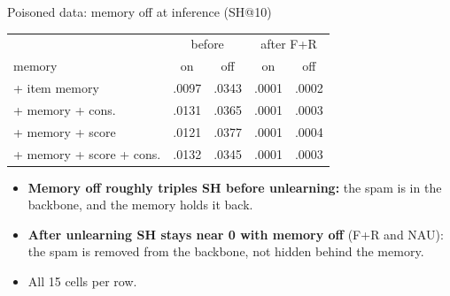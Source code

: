 \documentclass{beamer}
\newcommand{\dn}[1]{\textcolor{red!70!black}{#1}}
\begin{document}
\begin{frame}{Poisoned data: memory off at inference (SH@10)}
\centering
\small
\begin{tabular}{lcccc}
\toprule
                         & \multicolumn{2}{c}{before} & \multicolumn{2}{c}{after F+R} \\
memory                   & on & off & on & off \\
\midrule
+ item memory            & .0097 & \dn{.0343} & .0001 & .0002 \\
+ memory + cons.         & .0131 & \dn{.0365} & .0001 & .0003 \\
+ memory + score         & .0121 & \dn{.0377} & .0001 & .0004 \\
+ memory + score + cons. & .0132 & \dn{.0345} & .0001 & .0003 \\
\bottomrule
\end{tabular}

\medskip
\begin{itemize}\footnotesize
  \item \textbf{Memory off roughly triples SH before unlearning:} the spam
        is in the backbone, and the memory holds it back.
  \item \textbf{After unlearning SH stays near 0 with memory off} (F+R and
        NAU): the spam is removed from the backbone, not hidden behind the
        memory.
  \item All 15 cells per row.
\end{itemize}
\end{frame}
\end{document}
